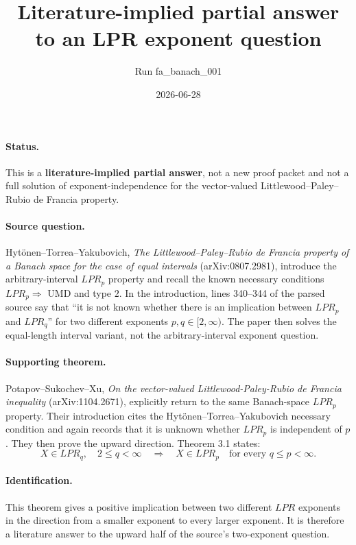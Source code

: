 \documentclass[11pt]{article}
\title{Literature-implied partial answer to an LPR exponent question}
\author{Run fa\_banach\_001}
\date{2026-06-28}
\begin{document}
\maketitle
\sloppy

\paragraph{Status.}
This is a \textbf{literature-implied partial answer}, not a new proof packet
and not a full solution of exponent-independence for the vector-valued
Littlewood--Paley--Rubio de Francia property.

\paragraph{Source question.}
Hytönen--Torrea--Yakubovich, \emph{The Littlewood--Paley--Rubio de Francia
property of a Banach space for the case of equal intervals}
(arXiv:0807.2981), introduce the arbitrary-interval \(LPR_p\) property and
recall the known necessary conditions \(LPR_p \Rightarrow\) UMD and type \(2\).
In the introduction, lines 340--344 of the parsed source say that ``it is not
known whether there is an implication between \(LPR_p\) and \(LPR_q\)'' for
two different exponents \(p,q\in[2,\infty)\).
The paper then solves the equal-length interval variant, not the
arbitrary-interval exponent question.

\paragraph{Supporting theorem.}
Potapov--Sukochev--Xu, \emph{On the vector-valued Littlewood-Paley-Rubio de
Francia inequality} (arXiv:1104.2671), explicitly return to the same
Banach-space \(LPR_p\) property.  Their introduction cites the
Hytönen--Torrea--Yakubovich necessary condition and again records that it is
unknown whether \(LPR_p\) is independent of \(p\).  They then prove the upward
direction.  Theorem 3.1 states:
\[
  X\in LPR_q,\quad 2\le q<\infty
  \quad\Longrightarrow\quad
  X\in LPR_p\quad\text{for every }q\le p<\infty .
\]

\paragraph{Identification.}
This theorem gives a positive implication between two different \(LPR\)
exponents in the direction from a smaller exponent to every larger exponent.
It is therefore a literature answer to the upward half of the source's
two-exponent question.
\end{document}

